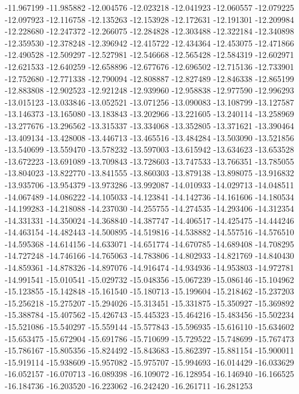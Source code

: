 -11.967199
-11.985882
-12.004576
-12.023218
-12.041923
-12.060557
-12.079225
-12.097923
-12.116758
-12.135263
-12.153928
-12.172631
-12.191301
-12.209984
-12.228680
-12.247372
-12.266075
-12.284828
-12.303488
-12.322184
-12.340898
-12.359530
-12.378248
-12.396942
-12.415722
-12.434364
-12.453075
-12.471866
-12.490528
-12.509297
-12.527981
-12.546668
-12.565428
-12.584319
-12.602971
-12.621533
-12.640259
-12.658896
-12.677676
-12.696502
-12.715136
-12.733901
-12.752680
-12.771338
-12.790094
-12.808887
-12.827489
-12.846338
-12.865199
-12.883808
-12.902523
-12.921248
-12.939960
-12.958838
-12.977590
-12.996293
-13.015123
-13.033846
-13.052521
-13.071256
-13.090083
-13.108799
-13.127587
-13.146373
-13.165080
-13.183843
-13.202966
-13.221605
-13.240114
-13.258969
-13.277676
-13.296562
-13.315337
-13.334068
-13.352805
-13.371621
-13.390464
-13.409134
-13.428008
-13.446713
-13.465516
-13.484284
-13.503090
-13.521856
-13.540699
-13.559470
-13.578232
-13.597003
-13.615942
-13.634623
-13.653528
-13.672223
-13.691089
-13.709843
-13.728603
-13.747533
-13.766351
-13.785055
-13.804023
-13.822770
-13.841555
-13.860303
-13.879138
-13.898075
-13.916832
-13.935706
-13.954379
-13.973286
-13.992087
-14.010933
-14.029713
-14.048511
-14.067489
-14.086222
-14.105033
-14.123841
-14.142736
-14.161606
-14.180534
-14.199283
-14.218088
-14.237030
-14.255755
-14.274535
-14.293406
-14.312354
-14.331331
-14.350024
-14.368840
-14.387747
-14.406517
-14.425475
-14.444246
-14.463154
-14.482443
-14.500895
-14.519816
-14.538882
-14.557516
-14.576510
-14.595368
-14.614156
-14.633071
-14.651774
-14.670785
-14.689408
-14.708295
-14.727248
-14.746166
-14.765063
-14.783806
-14.802933
-14.821769
-14.840430
-14.859361
-14.878326
-14.897076
-14.916474
-14.934936
-14.953803
-14.972781
-14.991541
-15.010541
-15.029732
-15.048356
-15.067239
-15.086146
-15.104962
-15.123855
-15.142848
-15.161540
-15.180713
-15.199604
-15.218462
-15.237203
-15.256218
-15.275207
-15.294026
-15.313451
-15.331875
-15.350927
-15.369892
-15.388784
-15.407562
-15.426743
-15.445323
-15.464216
-15.483456
-15.502234
-15.521086
-15.540297
-15.559144
-15.577843
-15.596935
-15.616110
-15.634602
-15.653475
-15.672904
-15.691786
-15.710699
-15.729522
-15.748699
-15.767473
-15.786167
-15.805356
-15.824492
-15.843683
-15.862397
-15.881154
-15.900011
-15.919114
-15.938609
-15.957082
-15.975707
-15.994693
-16.014429
-16.033629
-16.052157
-16.070713
-16.089398
-16.109072
-16.128954
-16.146940
-16.166525
-16.184736
-16.203520
-16.223062
-16.242420
-16.261711
-16.281253

